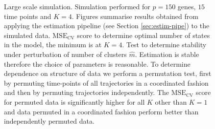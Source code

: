 \begin{figure}
  \centering
  \caption{Large scale simulation. Simulation performed for $p=150$ genes, $15$ time points and $K=4$. Figures summarise results obtained from applying the estimation pipeline (see Section \ref{sec:estim-pipe}) to the simulated data.  $\mathrm{MSE_{CV}}$ score to determine optimal number of states in the model, the minimum is at $K = 4$.  Test to determine stability under perturbation of number of clusters $\hat{m}$. Estimation is stable therefore the choice of parameters is reasonable.  To determine dependence on structure of data we perform a permutation test, first by permuting time-points of all trajectories in a coordinated fashion and then by permuting trajectories independently. The $\mathrm{MSE_{CV}}$ score for permuted data is significantly higher for all $K$ other than $K=1$ and data permuted in a coordinated fashion perform better than independently permuted data.}
  \label{fig:lrg-sim-k-m}
\end{figure}


